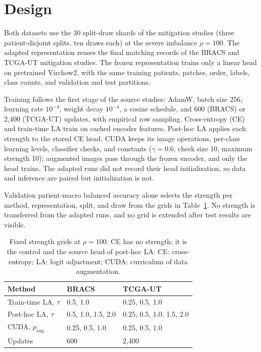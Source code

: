 \documentclass[11pt]{article}
\begin{document}
\section{Design}
\label{sec:design}
Both datasets use the 30 split-draw shards of the mitigation studies (three patient-disjoint splits, ten draws each) at the severe imbalance $\rho=100$. The adapted representation reuses the final matching records of the BRACS and TCGA-UT mitigation studies. The frozen representation trains only a linear head on pretrained Virchow2, with the same training patients, patches, order, labels, class counts, and validation and test partitions.

Training follows the first stage of the source studies: AdamW, batch size 256, learning rate $10^{-4}$, weight decay $10^{-4}$, a cosine schedule, and 600 (BRACS) or 2,400 (TCGA-UT) updates, with empirical row sampling. Cross-entropy (CE) and train-time LA train on cached encoder features. Post-hoc LA applies each strength to the stored CE head. CUDA keeps its image operations, per-class learning levels, classifier checks, and constants ($\gamma=0.6$, check size 10, maximum strength 10); augmented images pass through the frozen encoder, and only the head trains. The adapted runs did not record their head initialization, so data and inference are paired but initialization is not.

Validation patient-macro balanced accuracy alone selects the strength per method, representation, split, and draw from the grids in Table~\ref{tab:grid}. No strength is transferred from the adapted runs, and no grid is extended after test results are visible.

\begin{table}[htbp]
\centering
\small
\renewcommand{\arraystretch}{1.15}
\begin{tabular}{@{}lll@{}}
\toprule
Method & BRACS & TCGA-UT \\
\midrule
Train-time LA, $\tau$ & 0.5, 1.0 & 0.25, 0.5, 1.0 \\
Post-hoc LA, $\tau$ & 0.5, 1.0, 1.5, 2.0 & 0.25, 0.5, 1.0, 1.5, 2.0 \\
CUDA, $p_{\mathrm{aug}}$ & 0.25, 0.5, 1.0 & 0.25, 0.5, 1.0 \\
Updates & 600 & 2,400 \\
\bottomrule
\end{tabular}
\caption{Fixed strength grids at $\rho=100$. CE has no strength; it is the control and the source head of post-hoc LA. CE: cross-entropy; LA: logit adjustment; CUDA: curriculum of data augmentation.}
\label{tab:grid}
\end{table}
\end{document}
